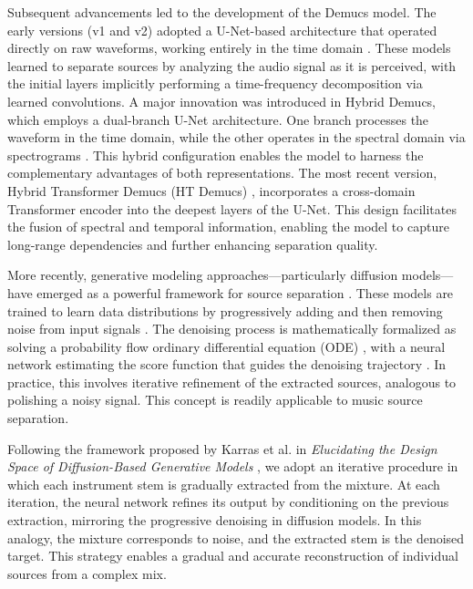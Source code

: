\documentclass{article}
\begin{document}
\begin{sloppy}
Subsequent advancements led to the development of the Demucs model. The early versions (v1 and v2) adopted a U-Net-based architecture that operated directly on raw waveforms, working entirely in the time domain \cite{Demucs}. These models learned to separate sources by analyzing the audio signal as it is perceived, with the initial layers implicitly performing a time-frequency decomposition via learned convolutions. A major innovation was introduced in Hybrid Demucs, which employs a dual-branch U-Net architecture. One branch processes the waveform in the time domain, while the other operates in the spectral domain via spectrograms \cite{HybridDemucs}. This hybrid configuration enables the model to harness the complementary advantages of both representations. The most recent version, Hybrid Transformer Demucs (HT Demucs) \cite{rouard2023hybrid}, incorporates a cross-domain Transformer encoder into the deepest layers of the U-Net. This design facilitates the fusion of spectral and temporal information, enabling the model to capture long-range dependencies and further enhancing separation quality.

More recently, generative modeling approaches—particularly diffusion models—have emerged as a powerful framework for source separation \cite{Karchkhadze2024Improving}. These models are trained to learn data distributions by progressively adding and then removing noise from input signals \cite{Karchkhadze2024Improving}. The denoising process is mathematically formalized as solving a probability flow ordinary differential equation (ODE) \cite{Karchkhadze2024Improving}, with a neural network estimating the score function that guides the denoising trajectory \cite{Karchkhadze2024Improving}. In practice, this involves iterative refinement of the extracted sources, analogous to polishing a noisy signal. This concept is readily applicable to music source separation.

Following the framework proposed by Karras et al. in \textit{Elucidating the Design Space of Diffusion-Based Generative Models} \cite{karras2022elucidating}, we adopt an iterative procedure in which each instrument stem is gradually extracted from the mixture. At each iteration, the neural network refines its output by conditioning on the previous extraction, mirroring the progressive denoising in diffusion models. In this analogy, the mixture corresponds to noise, and the extracted stem is the denoised target. This strategy enables a gradual and accurate reconstruction of individual sources from a complex mix.


\end{sloppy}
\end{document}
